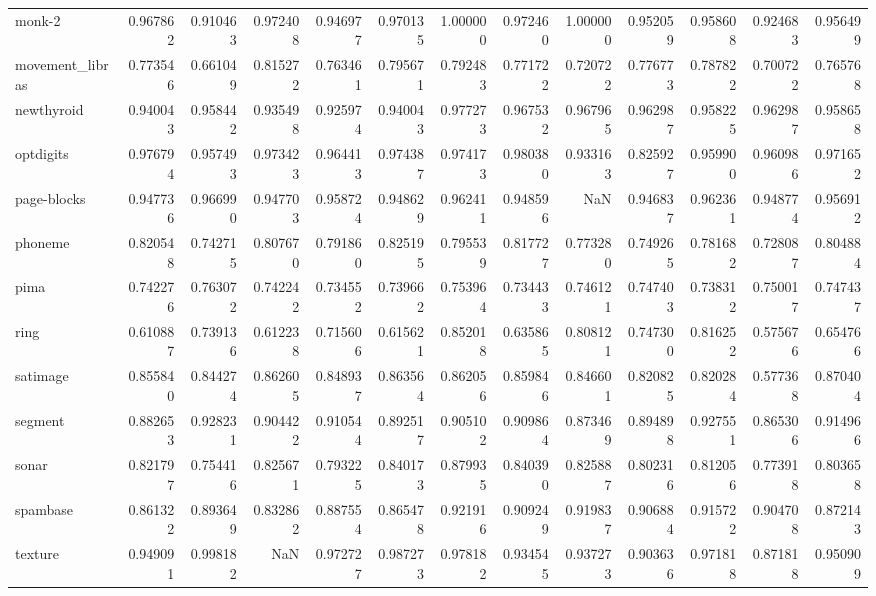 \begin{tabular}{lrrrrrrrrrrrr}
monk-2          &   0.967862 &  0.910463 &  0.972408 &  0.946977 &  0.970135 &  1.000000 &  0.972460 &  1.000000 &  0.952059 &  0.958608 &  0.924683 &  0.956499 \\
movement\_libras &   0.773546 &  0.661049 &  0.815272 &  0.763461 &  0.795671 &  0.792483 &  0.771722 &  0.720722 &  0.776773 &  0.787822 &  0.700722 &  0.765768 \\
newthyroid      &   0.940043 &  0.958442 &  0.935498 &  0.925974 &  0.940043 &  0.977273 &  0.967532 &  0.967965 &  0.962987 &  0.958225 &  0.962987 &  0.958658 \\
optdigits       &   0.976794 &  0.957493 &  0.973423 &  0.964413 &  0.974387 &  0.974173 &  0.980380 &  0.933163 &  0.825927 &  0.959900 &  0.960986 &  0.971652 \\
page-blocks     &   0.947736 &  0.966990 &  0.947703 &  0.958724 &  0.948629 &  0.962411 &  0.948596 &       NaN &  0.946837 &  0.962361 &  0.948774 &  0.956912 \\
phoneme         &   0.820548 &  0.742715 &  0.807670 &  0.791860 &  0.825195 &  0.795539 &  0.817727 &  0.773280 &  0.749265 &  0.781682 &  0.728087 &  0.804884 \\
pima            &   0.742276 &  0.763072 &  0.742242 &  0.734552 &  0.739662 &  0.753964 &  0.734433 &  0.746121 &  0.747403 &  0.738312 &  0.750017 &  0.747437 \\
ring            &   0.610887 &  0.739136 &  0.612238 &  0.715606 &  0.615621 &  0.852018 &  0.635865 &  0.808121 &  0.747300 &  0.816252 &  0.575676 &  0.654766 \\
satimage        &   0.855840 &  0.844274 &  0.862605 &  0.848937 &  0.863564 &  0.862056 &  0.859846 &  0.846601 &  0.820825 &  0.820284 &  0.577368 &  0.870404 \\
segment         &   0.882653 &  0.928231 &  0.904422 &  0.910544 &  0.892517 &  0.905102 &  0.909864 &  0.873469 &  0.894898 &  0.927551 &  0.865306 &  0.914966 \\
sonar           &   0.821797 &  0.754416 &  0.825671 &  0.793225 &  0.840173 &  0.879935 &  0.840390 &  0.825887 &  0.802316 &  0.812056 &  0.773918 &  0.803658 \\
spambase        &   0.861322 &  0.893649 &  0.832862 &  0.887554 &  0.865478 &  0.921916 &  0.909249 &  0.919837 &  0.906884 &  0.915722 &  0.904708 &  0.872143 \\
texture         &   0.949091 &  0.998182 &       NaN &  0.972727 &  0.987273 &  0.978182 &  0.934545 &  0.937273 &  0.903636 &  0.971818 &  0.871818 &  0.950909 \\

\end{tabular}
